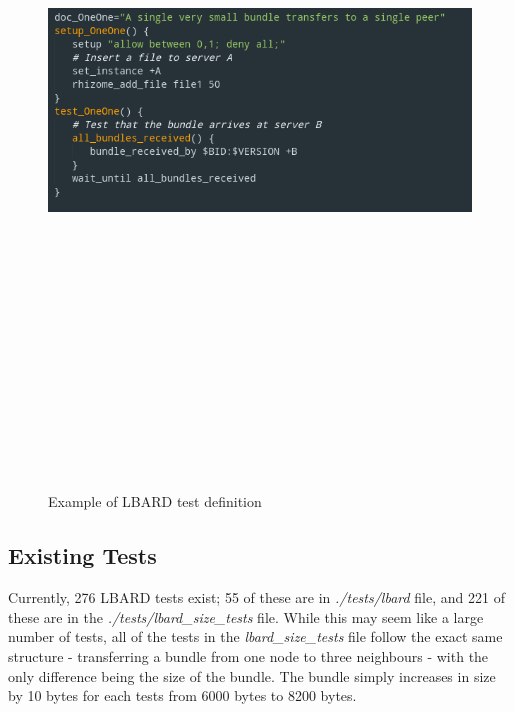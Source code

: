 \begin{figure}
    \begin{centering}
        \includegraphics[width=14cm,height=20cm,keepaspectratio]{Figures/testdefinitionexample.png}
        \caption{Example of LBARD test definition}
        \label{fig:testDefinition}
    \end{centering}
\end{figure}

\subsection{Existing Tests}
Currently, 276 LBARD tests exist; 55 of these are in \emph{./tests/lbard} file, and 221 of these are in the \emph{./tests/lbard\_size\_tests} file.
While this may seem like a large number of tests, all of the tests in the \emph{lbard\_size\_tests} file follow the exact same structure - transferring a bundle from one node to three neighbours - with the only difference being the size of the bundle.
The bundle simply increases in size by 10 bytes for each tests from 6000 bytes to 8200 bytes.

